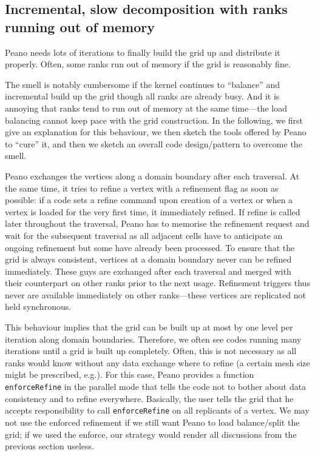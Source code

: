 \subsection{Incremental, slow decomposition with ranks running out
of memory}
\label{subsection:mpi-setup:slow-incremental-setup}


\begin{smell}
Peano needs lots of iterations to finally build the grid up and distribute it
properly.
Often, some ranks run out of memory if the grid is reasonably fine.
\end{smell}



\noindent
The smell is notably cumbersome if the kernel continues to ``balance'' and
incremental build up the grid though all ranks are already busy.
And it is annoying that ranks tend to run out of memory at the same
time---the load balancing cannot keep pace with the grid construction.
In the following, we first give an explanation for this behaviour, we then
sketch the tools offered by Peano to ``cure'' it, and then we sketch an overall
code design/pattern to overcome the smell.


Peano exchanges the vertices along a domain boundary after each traversal.
At the same time, it tries to refine a vertex with a refinement flag as soon as
possible: 
if a code sets a refine command upon creation of a vertex or when a vertex is
loaded for the very first time, it immediately refined.
If refine is called later throughout the traversal, Peano has to memorise the 
refinement request and wait for the subsequent traversal as all adjacent cells
have to anticipate an ongoing refinement but some have already been processed.
To ensure that the grid is always consistent, vertices at a domain boundary
never can be refined immediately. 
These guys are exchanged after each traversal and merged with their counterpart
on other ranks prior to the next usage. 
Refinement triggers thus never are available immediately on other ranks---these
vertices are replicated not held synchronous.

This behaviour implies that the grid can be built up at most by one level per
iteration along domain boundaries.
Therefore, we often see codes running many iterations until a  grid is
built up completely.
Often, this is not necessary as all ranks would know without any data
exchange where to refine (a certain mesh size might be prescribed, e.g.).
For this case, Peano provides a function \texttt{enforceRefine} in the parallel
mode that tells the code not to bother about data consistency and to refine 
everywhere. 
Basically, the user tells the grid that he accepts responsibility to call 
\texttt{enforceRefine} on all replicants of a vertex.
We may not use the enforced refinement if we still want Peano to load
balance/split the grid; if we used the enforce, our strategy would render all
discussions from the previous section useless.


